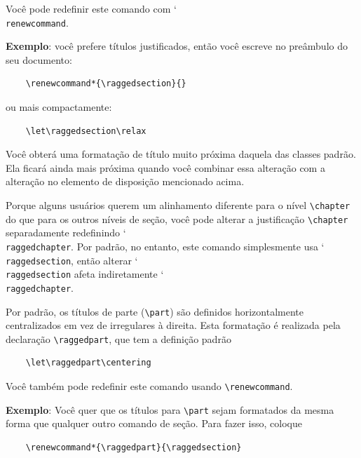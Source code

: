 Você pode redefinir este comando com \char`\\\texttt{renewcommand}.

\textbf{Exemplo}: você prefere títulos justificados, então você escreve no preâmbulo do seu documento:
\begin{verbatim}
    \renewcommand*{\raggedsection}{}
\end{verbatim}
ou mais compactamente:
\begin{verbatim}
    \let\raggedsection\relax
\end{verbatim}

Você obterá uma formatação de título muito próxima daquela das classes padrão. Ela ficará ainda mais próxima quando você combinar essa alteração com a alteração no elemento de disposição mencionado acima.

Porque alguns usuários querem um alinhamento diferente para o nível \verb|\chapter| do que para os outros níveis de seção, você pode alterar a justificação \verb|\chapter| separadamente redefinindo \char`\\\texttt{rag\-ged\-chap\-ter}. Por padrão, no entanto, este comando simplesmente usa \char`\\\texttt{rag\-ged\-sec\-tion}, então alterar \char`\\\texttt{rag\-ged\-sec\-tion} afeta indiretamente \char`\\\texttt{rag\-ged\-chap\-ter}.

Por padrão, os títulos de parte (\verb|\part|) são definidos horizontalmente centralizados em vez de irregulares à direita. Esta formatação é realizada pela declaração \verb|\raggedpart|, que tem a definição padrão
\begin{verbatim}
    \let\raggedpart\centering
\end{verbatim}


Você também pode redefinir este comando usando \verb|\renewcommand|.

\textbf{Exemplo}: Você quer que os títulos para \verb|\part| sejam formatados da mesma forma que qualquer outro comando de seção. Para fazer isso, coloque
\begin{verbatim}
    \renewcommand*{\raggedpart}{\raggedsection}
\end{verbatim}

